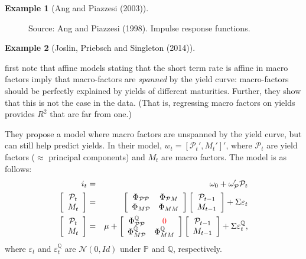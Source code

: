 \documentclass[
  12pt,
]{book}
\theoremstyle{definition}
\theoremstyle{definition}
\newtheorem{example}{Example}[chapter]
\theoremstyle{definition}
\theoremstyle{definition}
\theoremstyle{remark}
\begin{document}
\begin{example}[Ang and Piazzesi (2003)]
\begin{figure}
{}

\caption{Source: Ang and Piazzesi (1998). Impulse response functions.}\label{fig:figAngPiazzesi}
\end{figure}

\end{example}

\begin{example}[Joslin, Priebsch and Singleton (2014)]
\protect\hypertarget{exm:JPS}{}\label{exm:JPS}

\citet{Joslin_Priebsch_Singleton_2014} first note that affine models stating that the short term rate is affine in macro factors imply that macro-factors are \emph{spanned} by the yield curve: macro-factors should be perfectly explained by yields of different maturities. Further, they show that this is not the case in the data. (That is, regressing macro factors on yields provides \(R^2\) that are far from one.)

They propose a model where macro factors are unspanned by the yield curve, but can still help predict yields. In their model, \(w_t = [\mathcal{P}_t',M_t']'\), where \(\mathcal{P}_t\) are yield factors (\(\approx\) principal components) and \(M_t\) are macro factors. The model is as follows:
\begin{eqnarray*}
i_t &=& \omega_{0} + \omega_{\mathcal{P}}'\mathcal{P}_t \\
\left[\begin{array}{c}\mathcal{P}_t \\ M_t \end{array}\right]
&=&
\left[\begin{array}{cc}\Phi_{\mathcal{P}\mathcal{P}}&\Phi_{\mathcal{P}M} \\
\Phi_{M\mathcal{P}}&\Phi_{MM} \end{array}\right]
\left[\begin{array}{c}\mathcal{P}_{t-1} \\ M_{t-1} \end{array}\right] + \Sigma \varepsilon_t \\
\left[\begin{array}{c}\mathcal{P}_t \\ M_t \end{array}\right] &=& \mu +
\left[\begin{array}{cc}\Phi^{\mathbb{Q}}_{\mathcal{P}\mathcal{P}}&{\color{red}0} \\
\Phi^{\mathbb{Q}}_{M\mathcal{P}}&\Phi^{\mathbb{Q}}_{MM} \end{array}\right]
\left[\begin{array}{c}\mathcal{P}_{t-1} \\ M_{t-1} \end{array}\right] + \Sigma \varepsilon^{\mathbb{Q}}_t,
\end{eqnarray*}
where \(\varepsilon_t\) and \(\varepsilon^{\mathbb{Q}}_t\) are \(\mathcal{N}(0,Id)\) under \(\mathbb{P}\) and \(\mathbb{Q}\), respectively.


\end{example}
\end{document}
